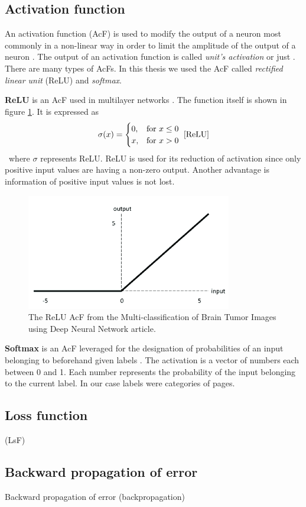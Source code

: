 \subsection{Activation function}\label{activationFunction}
An activation function (AcF) is used to modify the output of a neuron most commonly in a non-linear way in order to limit the amplitude of the output of a neuron \cite{activationFunction}. The output of an activation function is called \textit{unit's activation} or just . There are many types of AcFs. In this thesis we used the AcF called \textit{rectified linear unit} (ReLU) and \textit{softmax}.

\textbf{ReLU} is an AcF used in multilayer networks \cite{ReLU}. The function itself is shown in figure \ref{reluImage}. It is expressed as 
\[\sigma(x)= \begin{cases}
    0, & \text{for } x\leq 0\\
    x, & \text{for } x > 0
\end{cases}~\cite{ReLU}\] ~where $\sigma$ represents ReLU. ReLU is used for its reduction of activation since only positive input values are having a non-zero output. Another advantage is information of positive input values is not lost.
\begin{figure}[ht!]
  \centering
  \includegraphics[width=0.8\textwidth]{Images/ReLUFunction.png}
  \caption{The ReLU AcF from the Multi-classification of Brain Tumor Images using Deep Neural Network \cite{reluImage} article.} 
  \label{reluImage}
\end{figure} 

\textbf{Softmax} is an AcF leveraged for the designation of probabilities of an input belonging to beforehand given labels \cite{machineLeraningApproaches}. The activation is a vector of numbers each between 0 and 1. Each number represents the probability of the input belonging to the current label.  In our case labels were categories of pages.

\subsection{Loss function}\label{lossFunction}
(LsF)
\subsection{Backward propagation of error}\label{backpropagation}
Backward propagation of error  (backpropagation)
